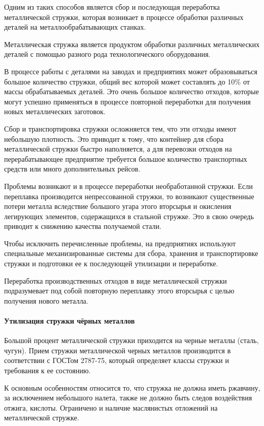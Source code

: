 Одним из таких способов является сбор и последующая переработка металлической стружки, которая возникает в процессе обработки различных деталей на металлообрабатывающих станках.

Металлическая стружка является продуктом обработки различных металлических деталей с помощью разного рода технологического оборудования.

В процессе работы с деталями на заводах и предприятиях может образовываться большое количество стружки, общий вес которой может составлять до 10\% от массы обрабатываемых деталей. Это очень большое количество отходов, которые могут успешно применяться в процессе повторной переработки для получения новых металлических заготовок.

Сбор и транспортировка стружки осложняется тем, что эти отходы имеют небольшую плотность. Это приводит к тому, что контейнер для сбора металлической стружки быстро наполняется, а для перевозки отходов на перерабатывающее предприятие требуется большое количество транспортных средств или много дополнительных рейсов.

Проблемы возникают и в процессе переработки необработанной стружки. Если переплавка производится непрессованной стружки, то возникают существенные потери металла вследствие большого угара этого вторсырья и окисления легирующих элементов, содержащихся в стальной стружке. Это в свою очередь приводит к снижению качества получаемой стали.

Чтобы исключить перечисленные проблемы, на предприятиях используют специальные механизированные системы для сбора, хранения и транспортировке стружки и подготовки ее к последующей утилизации и переработке.

Переработка производственных отходов в виде металлической стружки подразумевает под собой повторную переплавку этого вторсырья с целью получения нового металла.


\paragraph{Утилизация стружки чёрных металлов}

Большой процент металлической стружки приходится на черные металлы (сталь, чугун). Прием стружки металлической черных металлов производится в соответствии с ГОСТом 2787-75, который определяет классы стружки и требования к ее состоянию.

К основным особенностям относится то, что стружка не должна иметь ржавчину, за исключением небольшого налета, также не должно быть следов воздействия отжига, кислоты. Ограничено и наличие маслянистых отложений на металлической стружке.

